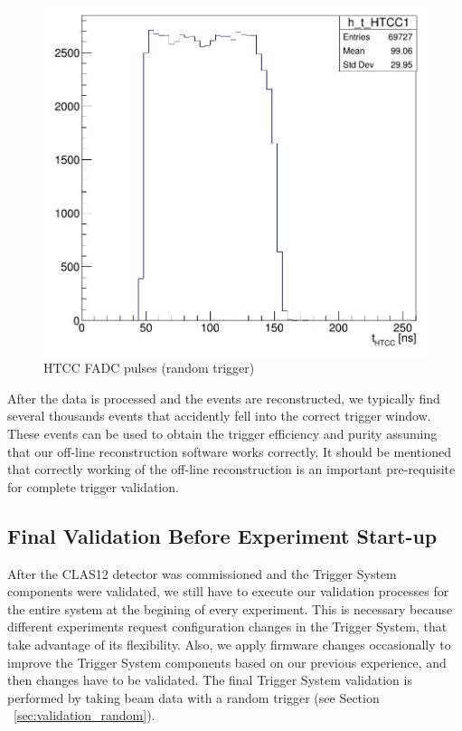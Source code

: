 \begin{figure}[hbt]
	\centering
	\includegraphics[width=1.0\columnwidth,keepaspectratio]{img/htcc_fadc2.png}
	\caption{HTCC FADC pulses (random trigger)}
	\label{fig:htcc_fadc2}
\end{figure}

After the data is processed and the events are reconstructed, we typically find several thousands events that accidently fell into the correct trigger window. These events can be used to obtain the trigger efficiency and purity assuming that our off-line reconstruction software works correctly. It should be mentioned that correctly working of the off-line reconstruction is an important pre-requisite for complete trigger validation.











\subsection{Final Validation Before Experiment Start-up}

After the CLAS12 detector was commissioned and the Trigger System components were validated, we still have to execute our validation processes for the entire system at the begining of every experiment. This is necessary because different experiments request configuration changes in the Trigger System, that take advantage of its flexibility. Also, we apply firmware changes occasionally to improve the Trigger System components based on our previous experience, and then changes have to be validated. The final Trigger System validation is performed by taking beam data with a random trigger (see Section ~\ref{sec:validation_random}).

